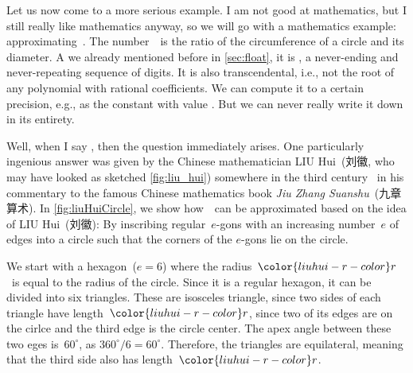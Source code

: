 %
%
\def\liuhuir{\ensuremath{{\color{liuhui-r-color}r}}}%
%
\def\liuhuiss{\ensuremath{{\color{liuhui-s6-color}s_6}}}%
%
\def\liuhuist{\ensuremath{{\color{liuhui-s12-color}s_{12}}}}%
%
\def\liuhuiy{\ensuremath{{\color{liuhui-y-color}y}}}%
%
\def\liuhuix{\ensuremath{{\color{liuhui-x-color}x}}}%
%
\def\liuhuistf{\ensuremath{{\color{liuhui-s24-color}s_{24}}}}%
%
Let us now come to a more serious example.
I am not good at mathematics, but I still really like mathematics anyway, so we will go with a mathematics example: approximating~\numberPi.
The number~\numberPi\ is the ratio of the circumference of a circle and its diameter.
A we already mentioned before in \cref{sec:float}, it is , a never-ending and never-repeating sequence of digits.
It is also \gls{transcendental}, i.e., not the root of any polynomial with rational coefficients.
We can compute it to a certain precision, e.g., as the  constant  with value .
But we can never really write it down in its entirety.

Well, when I say , then the question  immediately arises.
One particularly ingenious answer was given by the Chinese mathematician LIU Hui~(刘徽, who may have looked as sketched \cref{fig:liu_hui}) somewhere in the third century~ in his commentary to the famous Chinese mathematics book \emph{Jiu Zhang Suanshu}~(九章算术).
In \cref{fig:liuHuiCircle}, we show how~\numberPi\ can be approximated based on the idea of LIU Hui~(刘徽):
By inscribing regular~$e$\nobreakdashes-gons with an increasing number~$e$ of edges into a circle such that the corners of the $e$\nobreakdashes-gons lie on the circle.

We start with a hexagon~($e=6$) where the radius~\liuhuir\ is equal to the radius of the circle.
Since it is a regular hexagon, it can be divided into six triangles.
These are isosceles triangle, since two sides of each triangle have length~\liuhuir, since two of its edges are on the cirlce and the third edge is the circle center.
The apex angle between these two eges is~$60^{\circ}$, as $360^{\circ}/6=60^{\circ}$.
Therefore, the triangles are equilateral, meaning that the third side also has length~\liuhuir.

